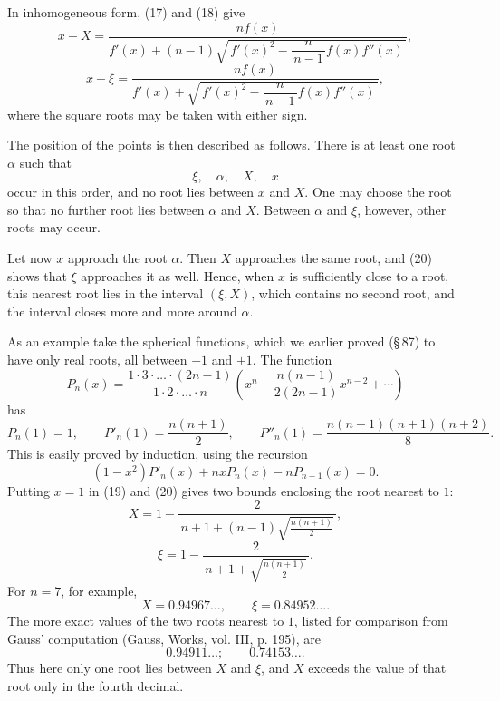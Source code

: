 \documentclass[11pt]{article}
\begin{document}
In inhomogeneous form, (17) and (18) give
\begin{equation}
        x-X=\frac{n f(x)}
        {f'(x)+(n-1)\sqrt{\,f'(x)^2-\dfrac{n}{\,n-1\,}f(x)f''(x)\,}},
\tag{19}
\end{equation}
\begin{equation}
        x-\xi=\frac{n f(x)}
        {f'(x)+\sqrt{\,f'(x)^2-\dfrac{n}{\,n-1\,}f(x)f''(x)\,}},
\tag{20}
\end{equation}
where the square roots may be taken with either sign.

The position of the points is then described as follows. There is at least one root $\alpha$ such that
\begin{equation}
        \xi,\quad \alpha,\quad X,\quad x
\tag{21}
\end{equation}
occur in this order, and no root lies between $x$ and $X$. One may choose the root so that no further root lies between $\alpha$ and $X$. Between $\alpha$ and $\xi$, however, other roots may occur.

Let now $x$ approach the root $\alpha$. Then $X$ approaches the same root, and (20) shows that $\xi$ approaches it as well. Hence, when $x$ is sufficiently close to a root, this nearest root lies in the interval $(\xi,X)$, which contains no second root, and the interval closes more and more around $\alpha$.

As an example take the spherical functions, which we earlier proved (\S\,87) to have only real roots, all between $-1$ and $+1$. The function
\[
        P_n(x)=\frac{1\cdot3\cdot\ldots\cdot(2n-1)}
        {1\cdot2\cdot\ldots\cdot n}
        \left(x^n-\frac{n(n-1)}{2(2n-1)}x^{n-2}+\cdots\right)
\]
has
\[
        P_n(1)=1,\qquad
        P'_n(1)=\frac{n(n+1)}2,\qquad
        P''_n(1)=\frac{n(n-1)(n+1)(n+2)}8.
\]
This is easily proved by induction, using the recursion
\[
        (1-x^2)P'_n(x)+nxP_n(x)-nP_{n-1}(x)=0.
\]
Putting $x=1$ in (19) and (20) gives two bounds enclosing the root nearest to $1$:
\[
        X=1-\frac{2}{\,n+1+(n-1)\sqrt{\frac{n(n+1)}2}\,},
\]
\[
        \xi=1-\frac{2}{\,n+1+\sqrt{\frac{n(n+1)}2}\,}.
\]
For $n=7$, for example,
\[
        X=0.94967\ldots,\qquad \xi=0.84952\ldots .
\]
The more exact values of the two roots nearest to $1$, listed for comparison from Gauss' computation (Gauss, Works, vol. III, p. 195), are
\[
        0.94911\ldots;\qquad 0.74153\ldots .
\]
Thus here only one root lies between $X$ and $\xi$, and $X$ exceeds the value of that root only in the fourth decimal.
\end{document}
